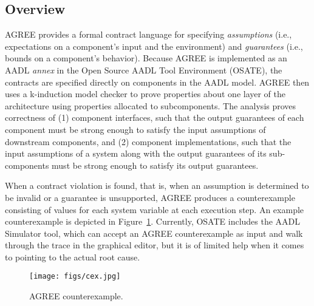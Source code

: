 \subsection{Overview}

AGREE provides a formal contract language for specifying \textit{assumptions} (i.e., expectations on a component's input and the environment) and \textit{guarantees} (i.e., bounds on a component's behavior).  Because AGREE is implemented as an AADL \textit{annex} in the Open Source AADL Tool Environment (OSATE), the contracts are specified directly on components in the AADL model.  AGREE then uses a k-induction model checker to prove properties about one layer of the architecture using properties allocated to subcomponents. The analysis proves correctness of (1) component interfaces, such that the output guarantees of each component must be strong enough to satisfy the input assumptions of downstream components, and (2) component implementations, such that the input assumptions of a system along with the output guarantees of its sub-components must be strong enough to satisfy its output guarantees.

When a contract violation is found, that is, when an assumption is determined to be invalid or a guarantee is unsupported, AGREE produces a counterexample consisting of values for each system variable at each execution step.  An example counterexample is depicted in Figure~\ref{fig:cex}.  Currently, OSATE includes the AADL Simulator tool, which can accept an AGREE counterexample as input and walk through the trace in the graphical editor, but it is of limited help when it comes to pointing to the actual root cause. 


\begin{figure}[h] 
	\centering 
	\texttt{[image: figs/cex.jpg]}
	\caption{AGREE counterexample.}
	\label{fig:cex} 
\end{figure}



